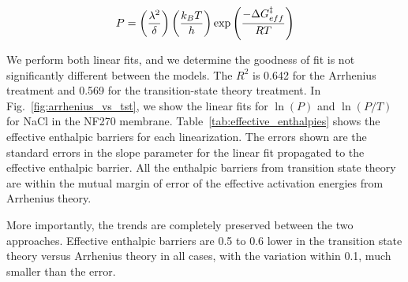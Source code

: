 \begin{equation}
    P = \left( \frac{\lambda^2}{\delta} \right) \left( \frac{k_B T}{h} \right) \exp{\left( \frac{-\Delta G_{eff}^{\ddagger}}{R T} \right)}
    \label{eq:SM_permeability_eyring_effective}
\end{equation}

We perform both linear fits, and we determine the goodness of fit is not significantly different between the models. The $R^2$ is 0.642 for the Arrhenius treatment and 0.569 for the transition-state theory treatment. In Fig.~\ref{fig:arrhenius_vs_tst}, we show the linear fits for $\ln(P)$ and $\ln(P/T)$ for NaCl in the NF270 membrane. Table~\ref{tab:effective_enthalpies} shows the effective enthalpic barriers for each linearization. The errors shown are the standard errors in the slope parameter for the linear fit propagated to the effective enthalpic barrier. All the enthalpic barriers from transition state theory are within the mutual margin of error of the effective activation energies from Arrhenius theory. 

More importantly, the trends are completely preserved between the two approaches. Effective enthalpic barriers are 0.5 to 0.6 lower in the transition state theory versus Arrhenius theory in all cases, with the variation within 0.1, much smaller than the error. 

\clearpage
\pagebreak

